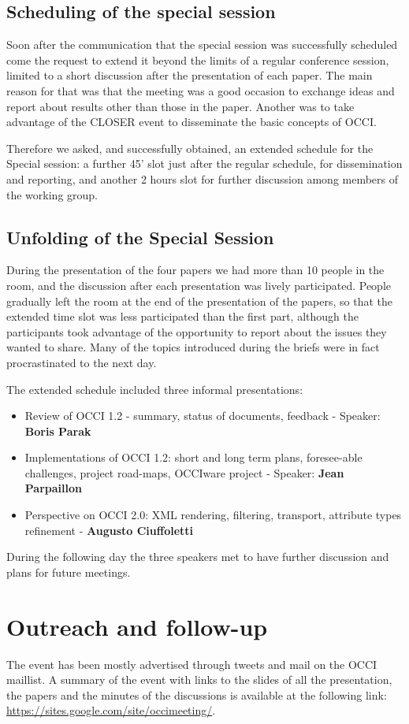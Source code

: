 \documentclass[10pt,a4paper]{article}
\begin{document}
\subsection*{Scheduling of the special session}

Soon after the communication that the special session was successfully scheduled come the request to extend it beyond the limits of a regular conference session, limited to a short discussion after the presentation of each paper. The main reason for that was that the meeting was a good occasion to exchange ideas and report about results other than those in the paper. Another was to take advantage of the CLOSER event to disseminate the basic concepts of OCCI.

Therefore we asked, and successfully obtained, an extended schedule for the Special session: a further 45' slot just after the regular schedule, for dissemination and reporting, and another 2 hours slot for further discussion among members of the working group.

\subsection{Unfolding of the Special Session}

During the presentation of the four papers we had more than 10 people in the room, and the discussion after each presentation was lively participated. People gradually left the room at the end of the presentation of the papers, so that the extended time slot was less participated than the first part, although the participants took advantage of the opportunity to report about the issues they wanted to share. Many of the topics introduced during the briefs were in fact procrastinated to the next day.

The extended schedule included three informal presentations:

\begin{itemize}
\item Review of OCCI 1.2 - summary, status of documents, feedback - Speaker: {\bf Boris Parak}
\item Implementations of OCCI 1.2: short and long term plans, foresee-able challenges, project road-maps, OCCIware project - Speaker: {\bf Jean Parpaillon}
\item Perspective on OCCI 2.0: XML rendering, filtering, transport, attribute types refinement - {\bf Augusto Ciuffoletti}
\end{itemize}

During the following day the three speakers met to have further discussion and plans for future meetings.

\section{Outreach and follow-up}

The event has been mostly advertised through tweets and mail on the OCCI maillist. A summary of the event with links to the slides of all the presentation, the papers and the minutes of the discussions is available at the following link:\\ \href{https://sites.google.com/site/occimeeting/}{https://sites.google.com/site/occimeeting/}.
\end{document}
